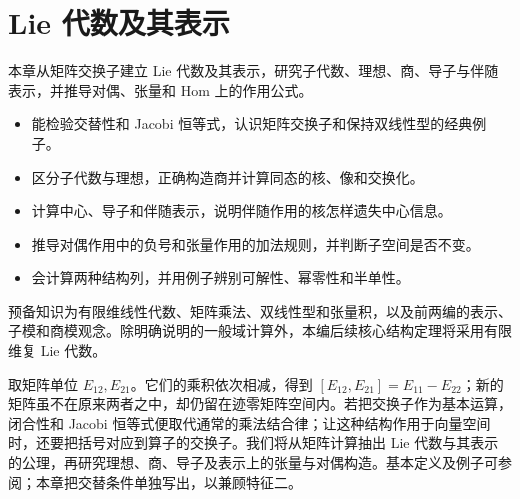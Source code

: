 
\chapter{Lie 代数及其表示}
\label{b5:ch:11}

\begin{chapterabstract}
	本章从矩阵交换子建立 Lie 代数及其表示，研究子代数、理想、商、导子与伴随表示，并推导对偶、张量和 Hom 上的作用公式。
\end{chapterabstract}

\begin{learninggoals}
	\begin{itemize}
		\item 能检验交替性和 Jacobi 恒等式，认识矩阵交换子和保持双线性型的经典例子。
		\item 区分子代数与理想，正确构造商并计算同态的核、像和交换化。
		\item 计算中心、导子和伴随表示，说明伴随作用的核怎样遗失中心信息。
		\item 推导对偶作用中的负号和张量作用的加法规则，并判断子空间是否不变。
		\item 会计算两种结构列，并用例子辨别可解性、幂零性和半单性。
	\end{itemize}
	预备知识为有限维线性代数、矩阵乘法、双线性型和张量积，以及前两编的表示、子模和商模观念。除明确说明的一般域计算外，本编后续核心结构定理将采用有限维复 Lie 代数。
\end{learninggoals}

取矩阵单位 \(E_{12},E_{21}\)。它们的乘积依次相减，得到 \([E_{12},E_{21}]=E_{11}-E_{22}\)；新的矩阵虽不在原来两者之中，却仍留在迹零矩阵空间内。若把交换子作为基本运算，闭合性和 Jacobi 恒等式便取代通常的乘法结合律；让这种结构作用于向量空间时，还要把括号对应到算子的交换子。我们将从矩阵计算抽出 Lie 代数与其表示的公理，再研究理想、商、导子及表示上的张量与对偶构造。基本定义及例子可参阅\cite[Section 2.9, pp.~22--25]{EtingofEtAl2011RepresentationTheory}；本章把交替条件单独写出，以兼顾特征二。

%
%






